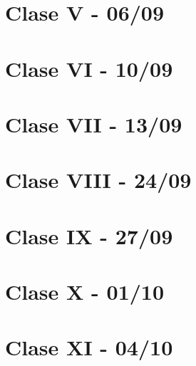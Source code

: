 \documentclass[12pt,a4paper]{book}
\begin{document}
\chapter{Clase V - 06/09}

\newpage\thispagestyle{empty}\blankpage

\chapter{Clase VI - 10/09}

\newpage\thispagestyle{empty}\blankpage

\chapter{Clase VII - 13/09}

\newpage\thispagestyle{empty}\blankpage

\chapter{Clase VIII - 24/09}

\newpage\thispagestyle{empty}\blankpage

\chapter{Clase IX - 27/09}

\newpage\thispagestyle{empty}\blankpage

\chapter{Clase X - 01/10}

\newpage\thispagestyle{empty}\blankpage

\chapter{Clase XI - 04/10}



\blankpage



\nocite{*}
\end{document}

